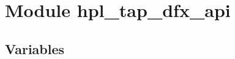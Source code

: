 %
%
%


\section{Module hpl\_tap\_dfx\_api}

    \label{hpl_tap_dfx_api}


  \subsection{Variables}

